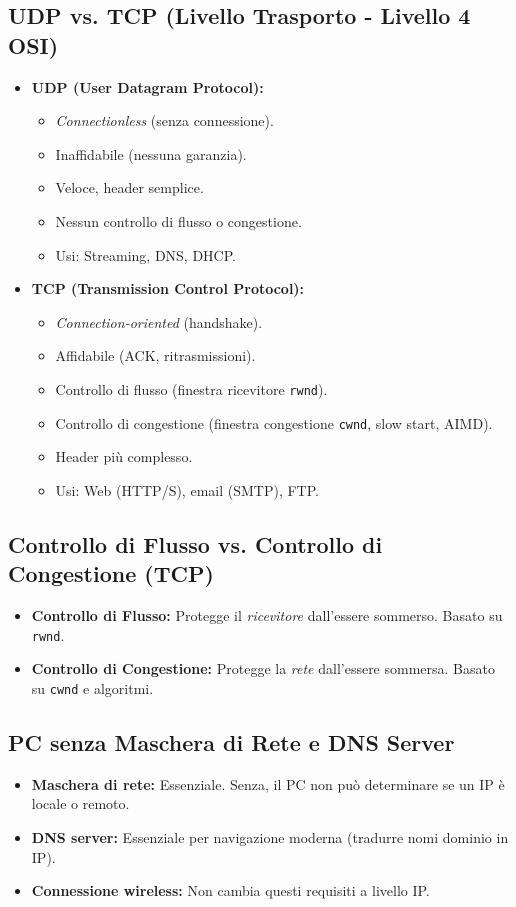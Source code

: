 \subsection{UDP vs. TCP (Livello Trasporto - Livello 4 OSI)}
\begin{itemize}
    \item \textbf{UDP (User Datagram Protocol):}
    \begin{itemize}
        \item \textit{Connectionless} (senza connessione).
        \item Inaffidabile (nessuna garanzia).
        \item Veloce, header semplice.
        \item Nessun controllo di flusso o congestione.
        \item Usi: Streaming, DNS, DHCP.
    \end{itemize}
    \item \textbf{TCP (Transmission Control Protocol):}
    \begin{itemize}
        \item \textit{Connection-oriented} (handshake).
        \item Affidabile (ACK, ritrasmissioni).
        \item Controllo di flusso (finestra ricevitore \texttt{rwnd}).
        \item Controllo di congestione (finestra congestione \texttt{cwnd}, slow start, AIMD).
        \item Header più complesso.
        \item Usi: Web (HTTP/S), email (SMTP), FTP.
    \end{itemize}
\end{itemize}

\subsection{Controllo di Flusso vs. Controllo di Congestione (TCP)}
\begin{itemize}
    \item \textbf{Controllo di Flusso:} Protegge il \textit{ricevitore} dall'essere sommerso. Basato su \texttt{rwnd}.
    \item \textbf{Controllo di Congestione:} Protegge la \textit{rete} dall'essere sommersa. Basato su \texttt{cwnd} e algoritmi.
\end{itemize}

\subsection{PC senza Maschera di Rete e DNS Server}
\begin{itemize}
    \item \textbf{Maschera di rete:} Essenziale. Senza, il PC non può determinare se un IP è locale o remoto.
    \item \textbf{DNS server:} Essenziale per navigazione moderna (tradurre nomi dominio in IP).
    \item \textbf{Connessione wireless:} Non cambia questi requisiti a livello IP.
\end{itemize}

